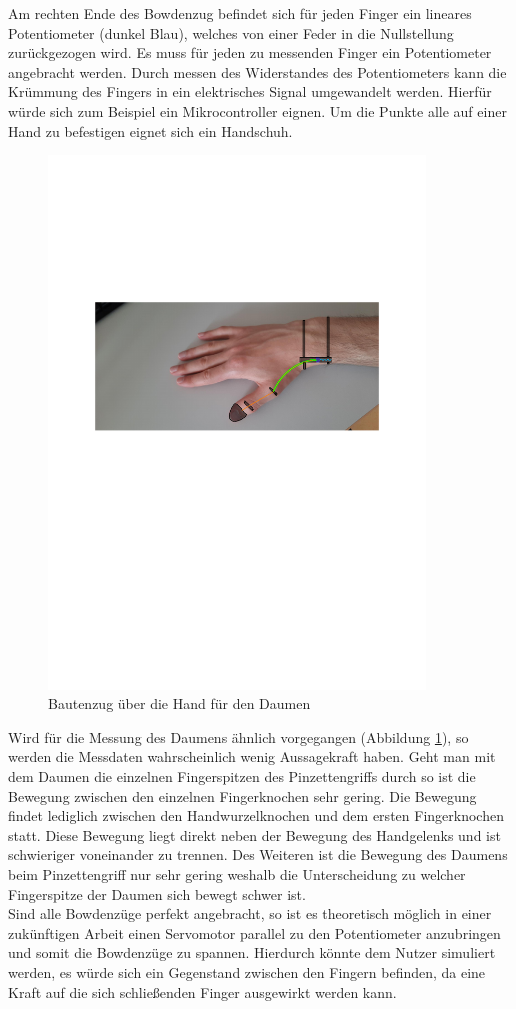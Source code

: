 \documentclass[a4paper,12pt,final]{article} %
\numberwithin{equation}{section} %
\numberwithin{figure}{section} %
\numberwithin{table}{section} %
\begin{document}
Am rechten Ende des Bowdenzug befindet sich für jeden Finger ein lineares Potentiometer (dunkel Blau), welches von einer Feder in die Nullstellung zurückgezogen wird.
Es muss für jeden zu messenden Finger ein Potentiometer an\-ge\-bracht werden. Durch messen des Widerstandes des Potentiometers kann die Krümmung des Fingers in ein elektrisches Signal umgewandelt werden. Hierfür würde sich zum Beispiel ein Mikrocontroller eignen. 
Um die Punkte alle auf einer Hand zu befestigen eignet sich ein Handschuh. 
\begin{figure}[H]
	\begin{center}
		\includegraphics[width=10cm]{Bilder/HandPhoto2.pdf}
		\caption{Bautenzug über die Hand für den Daumen}
		\label{fig:HandDaumen}
	\end{center}
\end{figure}
Wird für die Messung des Daumens ähnlich vorgegangen (Abbildung \ref{fig:HandDaumen}), so werden die Messdaten wahrscheinlich wenig Aussagekraft haben.
Geht man mit dem Daumen die einzelnen Fingerspitzen des Pinzettengriffs durch so ist die Bewegung zwischen den einzelnen Fingerknochen sehr gering. Die Bewegung findet lediglich zwischen den Hand\-wur\-zel\-knoch\-en und dem ersten Fingerknochen statt.
Diese Bewegung liegt direkt neben der Bewegung des Handgelenks und ist schwieriger voneinander zu trennen. Des Weiteren ist die Bewegung des Daumens beim Pinzettengriff nur sehr gering weshalb  die Un\-ter\-schei\-dung zu welcher Fingerspitze der Daumen sich bewegt schwer ist.\\
Sind alle Bowdenzüge perfekt angebracht, so ist es theoretisch möglich in einer zu\-künf\-tig\-en Arbeit einen Servomotor parallel zu den Potentiometer anzubringen und somit die Bowdenzüge zu spannen.
Hierdurch könnte dem Nutzer simuliert werden, es würde sich ein Gegenstand zwischen den Fingern befinden, da eine Kraft auf die sich schließenden Finger ausgewirkt werden kann.  
\end{document}
